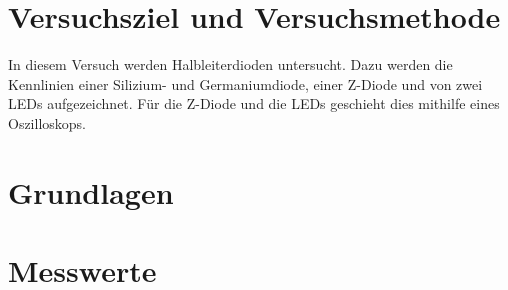 \documentclass[
12pt,
a4paper,
bibliography=totocnumbered, %
BCOR=1cm, %
oneside, %
]{scrartcl}
\newcommand{\lh}{\ell_{\mathrm{H}}}
\begin{document}
\thispagestyle{empty}



\thispagestyle{empty}

\tableofcontents

\clearpage %

\renewcommand{\thepage}{\arabic{page}}
\setcounter{page}{1}


\section[Versuchsziel]{Versuchsziel und Versuchsmethode}

In diesem Versuch werden Halbleiterdioden untersucht. Dazu werden die Kennlinien einer Silizium- und Germaniumdiode, einer Z-Diode und von zwei LEDs aufgezeichnet. Für die Z-Diode und die LEDs geschieht dies mithilfe eines Oszilloskops.

\section{Grundlagen}



\section{Messwerte}
\end{document}
